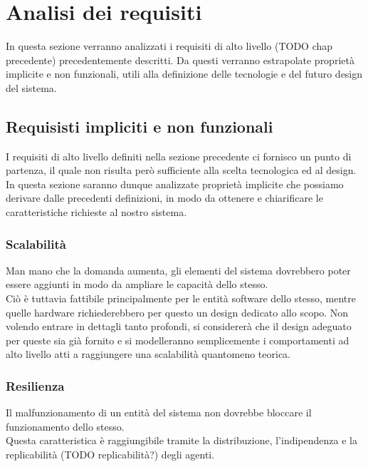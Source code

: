 \section{Analisi dei requisiti}


In questa sezione verranno analizzati i requisiti di alto livello (TODO chap precedente) precedentemente descritti. Da questi verranno estrapolate proprietà implicite e non funzionali, utili alla definizione delle tecnologie e del futuro design del sistema.

\subsection{Requisisti impliciti e non funzionali}
I requisiti di alto livello definiti nella sezione precedente ci fornisco un punto di partenza, il quale non risulta però sufficiente alla scelta tecnologica ed al design. In questa sezione saranno dunque analizzate proprietà implicite che possiamo derivare dalle precedenti definizioni, in modo da ottenere e chiarificare le caratteristiche richieste al nostro sistema.

\subsubsection{Scalabilità}
Man mano che la domanda aumenta, gli elementi del sistema dovrebbero poter essere aggiunti in modo da ampliare le capacità dello stesso.\\
Ciò è tuttavia fattibile principalmente per le entità software dello stesso, mentre quelle hardware richiederebbero per questo un design dedicato allo scopo. Non volendo entrare in dettagli tanto profondi, si considererà che il design adeguato per queste sia già fornito e si modelleranno semplicemente i comportamenti ad alto livello atti a raggiungere una scalabilità quantomeno teorica.

\subsubsection{Resilienza}
Il malfunzionamento di un entità del sistema non dovrebbe bloccare il funzionamento dello stesso.\\
Questa caratteristica è raggiungibile tramite la distribuzione, l'indipendenza e la replicabilità (TODO replicabilità?) degli agenti.

